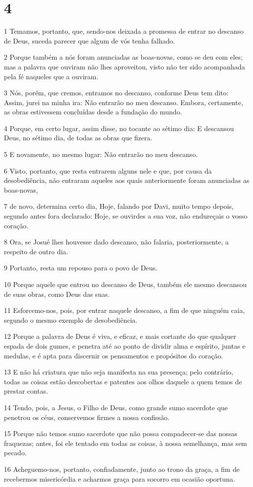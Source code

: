 \chapter{4}

\par 1 Temamos, portanto, que, sendo-nos deixada a promessa de entrar no descanso de Deus, suceda parecer que algum de vós tenha falhado.
\par 2 Porque também a nós foram anunciadas as boas-novas, como se deu com eles; mas a palavra que ouviram não lhes aproveitou, visto não ter sido acompanhada pela fé naqueles que a ouviram.
\par 3 Nós, porém, que cremos, entramos no descanso, conforme Deus tem dito: Assim, jurei na minha ira: Não entrarão no meu descanso. Embora, certamente, as obras estivessem concluídas desde a fundação do mundo.
\par 4 Porque, em certo lugar, assim disse, no tocante ao sétimo dia: E descansou Deus, no sétimo dia, de todas as obras que fizera.
\par 5 E novamente, no mesmo lugar: Não entrarão no meu descanso.
\par 6 Visto, portanto, que resta entrarem alguns nele e que, por causa da desobediência, não entraram aqueles aos quais anteriormente foram anunciadas as boas-novas,
\par 7 de novo, determina certo dia, Hoje, falando por Davi, muito tempo depois, segundo antes fora declarado: Hoje, se ouvirdes a sua voz, não endureçais o vosso coração.
\par 8 Ora, se Josué lhes houvesse dado descanso, não falaria, posteriormente, a respeito de outro dia.
\par 9 Portanto, resta um repouso para o povo de Deus.
\par 10 Porque aquele que entrou no descanso de Deus, também ele mesmo descansou de suas obras, como Deus das suas.
\par 11 Esforcemo-nos, pois, por entrar naquele descanso, a fim de que ninguém caia, segundo o mesmo exemplo de desobediência.
\par 12 Porque a palavra de Deus é viva, e eficaz, e mais cortante do que qualquer espada de dois gumes, e penetra até ao ponto de dividir alma e espírito, juntas e medulas, e é apta para discernir os pensamentos e propósitos do coração.
\par 13 E não há criatura que não seja manifesta na sua presença; pelo contrário, todas as coisas estão descobertas e patentes aos olhos daquele a quem temos de prestar contas.
\par 14 Tendo, pois, a Jesus, o Filho de Deus, como grande sumo sacerdote que penetrou os céus, conservemos firmes a nossa confissão.
\par 15 Porque não temos sumo sacerdote que não possa compadecer-se das nossas fraquezas; antes, foi ele tentado em todas as coisas, à nossa semelhança, mas sem pecado.
\par 16 Acheguemo-nos, portanto, confiadamente, junto ao trono da graça, a fim de recebermos misericórdia e acharmos graça para socorro em ocasião oportuna.

